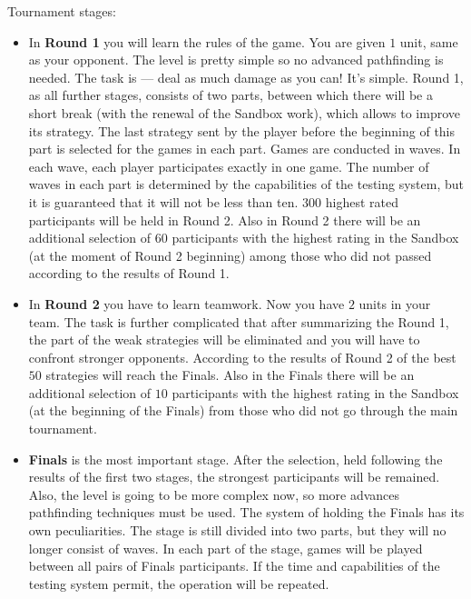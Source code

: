 Tournament stages:
\begin{itemize}
      \item
            In \textbf{Round 1} you will learn the rules of the game.
            You are given $1$ unit, same as your opponent. The level is pretty simple so no advanced pathfinding is needed.
            The task is --- deal as much damage as you can! It's simple.
            Round 1, as all further stages, consists of two parts, between which there will be a short break (with the renewal of the Sandbox work), which
            allows to improve its strategy. The last strategy sent by the player before the beginning of this part is selected for the games in each part.
            Games are conducted in waves. In each wave, each player participates exactly in one game. The number of waves in each part is determined by
            the capabilities of the testing system, but it is guaranteed that it will not be less than ten. $300$ highest rated participants
            will be held in Round 2. Also in Round 2 there will be an additional selection of $60$ participants with the highest rating in the Sandbox (at the moment
            of Round 2 beginning) among those who did not passed according to the results of Round 1.
      \item
            In \textbf{Round 2} you have to learn teamwork.
            Now you have $2$ units in your team.
            The task is further complicated
            that after summarizing the Round 1, the part of the weak strategies will be eliminated and you will have to confront stronger opponents. According
            to the results of Round 2 of the best $50$ strategies will reach the Finals. Also in the Finals there will be an additional selection of $10$ participants with
            the highest rating in the Sandbox (at the beginning of the Finals) from those who did not go through the main tournament.
      \item
            \textbf{Finals} is the most important stage. After the selection, held following the results of the first two stages, the strongest participants will be remained.
            Also, the level is going to be more complex now, so more advances pathfinding techniques must be used.
            The system of holding the Finals has its own peculiarities. The stage is still
            divided into two parts, but they will no longer consist of waves. In each part of the stage, games will be played between all pairs
            of Finals participants. If the time and capabilities of the testing system permit, the operation will be repeated.
\end{itemize}

